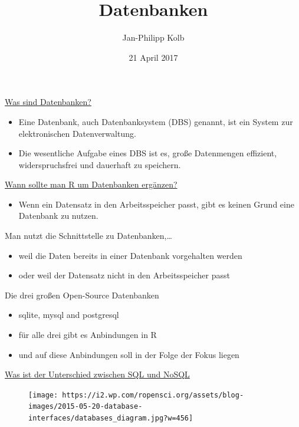 \documentclass[ignorenonframetext,]{beamer}
\title{Datenbanken}
\author{Jan-Philipp Kolb}
\date{21 April 2017}
\providecommand{\tightlist}{%
\setlength{\itemsep}{0pt}\setlength{\parskip}{0pt}}
\begin{document}
\frame{\titlepage}

\begin{frame}{\href{https://de.wikipedia.org/wiki/Datenbank}{Was sind
Datenbanken?}}

\begin{itemize}
\tightlist
\item
  Eine Datenbank, auch Datenbanksystem (DBS) genannt, ist ein System zur
  elektronischen Datenverwaltung.
\item
  Die wesentliche Aufgabe eines DBS ist es, große Datenmengen effizient,
  widerspruchsfrei und dauerhaft zu speichern.
\end{itemize}

\end{frame}

\begin{frame}{\href{https://cran.r-project.org/web/packages/dplyr/vignettes/databases.html}{Wann
sollte man R um Datenbanken ergänzen?}}

\begin{itemize}
\tightlist
\item
  Wenn ein Datensatz in den Arbeitsspeicher passt, gibt es keinen Grund
  eine Datenbank zu nutzen.
\end{itemize}

Man nutzt die Schnittstelle zu Datenbanken,\ldots{}

\begin{itemize}
\tightlist
\item
  weil die Daten bereits in einer Datenbank vorgehalten werden
\item
  oder weil der Datensatz nicht in den Arbeitsspeicher passt
\end{itemize}

\end{frame}

\begin{frame}{Die drei großen Open-Source Datenbanken}

\begin{itemize}
\tightlist
\item
  sqlite, mysql and postgresql
\item
  für alle drei gibt es Anbindungen in R
\item
  und auf diese Anbindungen soll in der Folge der Fokus liegen
\end{itemize}

\end{frame}

\begin{frame}{\href{https://www.r-bloggers.com/database-interfaces/}{Was
ist der Unterschied zwischen SQL und NoSQL}}

\begin{figure}[htbp]
\centering
\texttt{[image: https://i2.wp.com/ropensci.org/assets/blog-images/2015-05-20-database-interfaces/databases\_diagram.jpg?w=456]}
\caption{}
\end{figure}

\end{frame}
\end{document}
